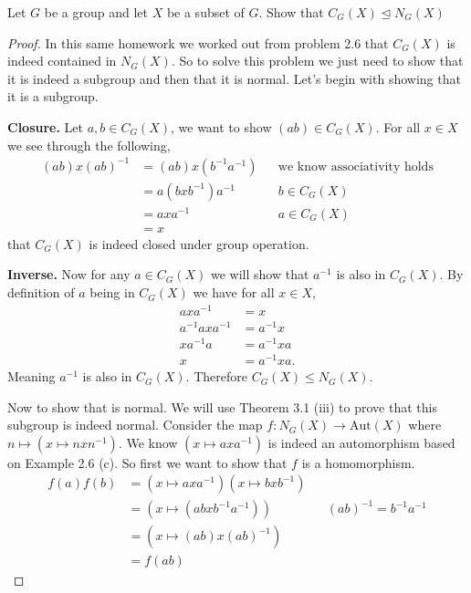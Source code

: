 \documentclass[10pt]{article}
\newenvironment{problem}[2][Problem\!]{\begin{trivlist}
\item[\hskip \labelsep {\bfseries #1}\hskip \labelsep {\bfseries #2.}]}{\end{trivlist}}
\renewcommand{\leq}{\leqslant}
\begin{document}
\begin{tcolorbox}
    \begin{problem}{3.2}
        Let $G$ be a group and let $X$ be a subset of $G$. Show that $C_G(X) \unlhd N_G(X)$
    \end{problem}
\end{tcolorbox}
\begin{proof}
    In this same homework we worked out from problem 2.6 that $C_G(X)$ is indeed contained in $N_G(X)$. So to solve this problem we just need to show that it is indeed a subgroup and then that it is normal. Let's begin with showing that it is a subgroup.

    \textbf{Closure.} Let $a,b \in C_G(X)$, we want to show $(ab) \in C_G(X)$. For all $x\in X$ we see through the following,
    \begin{align*}
        (ab)x(ab)^{-1} &= (ab)x(b^{-1}a^{-1}) && \text{we know associativity holds} \\
        &= a(bxb^{-1})a^{-1} && b \in C_G(X) \\
        &= axa^{-1} && a \in C_G(X) \\
        &= x
    \end{align*}
    that $C_G(X)$ is indeed closed under group operation. 

    \textbf{Inverse.} Now for any $a\in C_G(X)$ we will show that $a^{-1}$ is also in $C_G(X)$. By definition of $a$ being in $C_G(X)$ we have for all $x\in X$,
    \begin{align*}
        axa^{-1} &= x \\
        a^{-1}axa^{-1}&=a^{-1}x \\
        xa^{-1}a  &= a^{-1}x a \\
        x &= a^{-1}xa. 
    \end{align*}
    Meaning $a^{-1}$ is also in $C_G(X)$. Therefore $C_G(X) \leq N_G(X)$.

    Now to show that is normal. We will use Theorem 3.1 (iii) to prove that this subgroup is indeed normal. Consider the map $f: N_G(X) \to \text{Aut}(X)$ where $n \mapsto (x \mapsto nxn^{-1})$. We know $(x\mapsto axa^{-1})$ is indeed an automorphism based on Example 2.6 (c). So first we want to show that $f$ is a homomorphism. 
    \begin{align*}
        f(a)f(b) &= (x\mapsto axa^{-1})(x \mapsto bxb^{-1}) \\
                &= (x\mapsto (abxb^{-1}a^{-1}))&& (ab)^{-1} = b^{-1}a^{-1} \\
                &= (x\mapsto (ab)x(ab)^{-1}) \\
                &= f(ab)
    \end{align*}


\end{proof}
\end{document}
